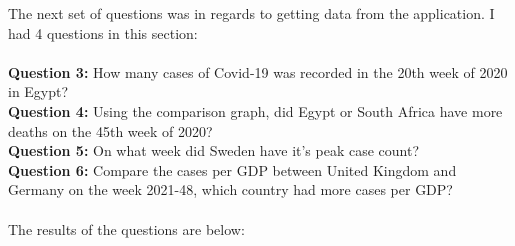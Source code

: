 \documentclass{report}
\begin{document}
The next set of questions was in regards to getting data from the application. I had 4 questions in this section: \\ \\
\textbf{Question 3: }How many cases of Covid-19 was recorded in the 20th week of 2020 in Egypt? \\
\textbf{Question 4: }Using the comparison graph, did Egypt or South Africa have more deaths on the 45th week of 2020?\\
\textbf{Question 5: }On what week did Sweden have it's peak case count?\\
\textbf{Question 6: }Compare the cases per GDP between United Kingdom and Germany on the week 2021-48, which country had more cases per GDP? \\ \\
The results of the questions are below:\\
\noindent
\begin{minipage}[t]{0.45\textwidth}
    \centering
\end{minipage}
\hfill
\begin{minipage}[t]{0.35\textwidth}
    \centering
\end{minipage}
\vspace{1cm}
\begin{minipage}[t]{0.45\textwidth}
    \centering
\end{minipage}
\hfill
\begin{minipage}[t]{0.35\textwidth}
    \centering
\end{minipage}
\end{document}
